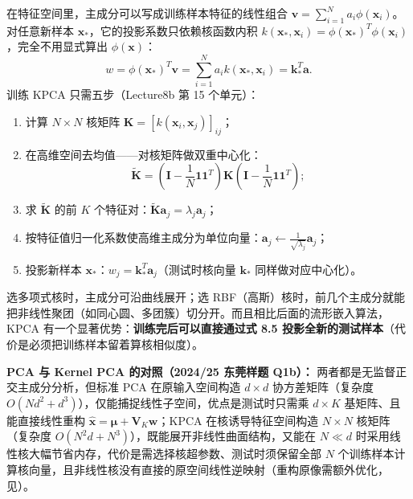 在特征空间里，主成分可以写成训练样本特征的线性组合 $\mathbf{v} = \sum_{i=1}^N a_i \phi(\mathbf{x}_i)$。对任意新样本 $\mathbf{x}_*$，它的投影系数只依赖核函数内积 $k(\mathbf{x}_*, \mathbf{x}_i) = \phi(\mathbf{x}_*)^T\phi(\mathbf{x}_i)$，完全不用显式算出 $\phi(\mathbf{x})$：
\[
w = \phi(\mathbf{x}_*)^T \mathbf{v} = \sum_{i=1}^N a_i k(\mathbf{x}_*, \mathbf{x}_i) = \mathbf{k}_*^T \mathbf{a}.
\tag{8.5}
\]
训练 KPCA 只需五步（Lecture8b 第 15 个单元）：
\begin{enumerate}
\item 计算 $N\times N$ 核矩阵 $\mathbf{K} = [k(\mathbf{x}_i, \mathbf{x}_j)]_{ij}$；
\item 在高维空间去均值——对核矩阵做双重中心化：
\[
\tilde{\mathbf{K}} = \left(\mathbf{I} - \frac{1}{N}\mathbf{1}\mathbf{1}^T\right)\mathbf{K}\left(\mathbf{I} - \frac{1}{N}\mathbf{1}\mathbf{1}^T\right);
\tag{8.6}
\]
\item 求 $\tilde{\mathbf{K}}$ 的前 $K$ 个特征对：$\tilde{\mathbf{K}}\mathbf{a}_j = \lambda_j \mathbf{a}_j$；
\item 按特征值归一化系数使高维主成分为单位向量：$\mathbf{a}_j \leftarrow \frac{1}{\sqrt{\lambda_j}}\mathbf{a}_j$；
\item 投影新样本 $\mathbf{x}_*$：$w_j = \mathbf{k}_*^T \mathbf{a}_j$（测试时核向量 $\mathbf{k}_*$ 同样做对应中心化）。
\end{enumerate}
选多项式核时，主成分可沿曲线展开；选 RBF（高斯）核时，前几个主成分就能把非线性聚团（如同心圆、多团簇）切分开。而且相比后面的流形嵌入算法，KPCA 有一个显著优势：\textbf{训练完后可以直接通过式 8.5 投影全新的测试样本}（代价是必须把训练样本留着算核相似度）。

\textbf{PCA 与 Kernel PCA 的对照（2024/25 东莞样题 Q1b）：} 两者都是无监督正交主成分分析，但标准 PCA 在原输入空间构造 $d\times d$ 协方差矩阵（复杂度 $O(Nd^2+d^3)$），仅能捕捉线性子空间，优点是测试时只需乘 $d\times K$ 基矩阵、且能直接线性重构 $\hat{\mathbf{x}}=\boldsymbol{\mu}+\mathbf{V}_K\mathbf{w}$；KPCA 在核诱导特征空间构造 $N\times N$ 核矩阵（复杂度 $O(N^2d+N^3)$），既能展开非线性曲面结构，又能在 $N\ll d$ 时采用线性核大幅节省内存，代价是需选择核超参数、测试时须保留全部 $N$ 个训练样本计算核向量，且非线性核没有直接的原空间线性逆映射（重构原像需额外优化，见）。


